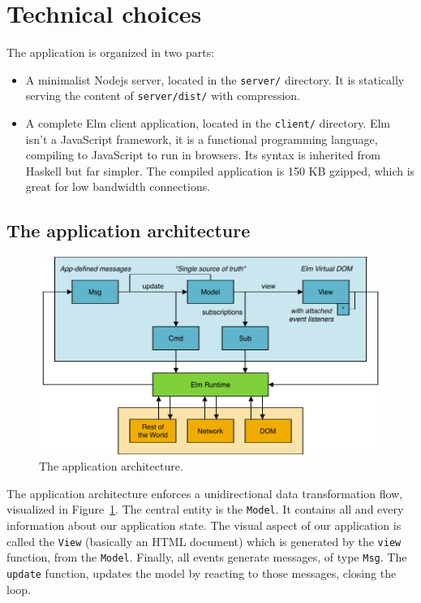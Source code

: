 \section{Technical choices}

The application is organized in two parts:

\begin{itemize}
\item A minimalist Nodejs server, located in the \verb|server/| directory.
	It is statically serving the content of \verb|server/dist/|
    with compression.
\item A complete Elm client application, located in the \verb|client/| directory.
    Elm~\cite{czaplicki2013asynchronous,czaplicki2017elm}
    isn't a JavaScript framework, it is a functional programming language,
	compiling to JavaScript to run in browsers.
	Its syntax is inherited from Haskell but far simpler.
	The compiled application is 150 KB gzipped,
    which is great for low bandwidth connections.
\end{itemize}


\subsection{The application architecture}

\begin{figure}[ht]
\includegraphics[width=\columnwidth]{img/tea-draw-io.pdf}
\caption{The application architecture.}%
\label{fig:tea}
\end{figure}

The application architecture enforces a unidirectional data transformation flow,
visualized in Figure~\ref{fig:tea}.
The central entity is the \verb|Model|.
It contains all and every information about our application state.
The visual aspect of our application is called the \verb|View|
(basically an HTML document) which is generated by the \verb|view| function,
from the \verb|Model|. Finally, all events generate messages, of type \verb|Msg|.
The \verb|update| function, updates the model by reacting to those messages, closing the loop.

